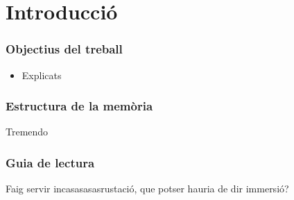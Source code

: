 \chapter{Introducci\'o}



\subsection*{Objectius del treball}

\begin{itemize}
    \item Explicats
\end{itemize}

\subsection*{Estructura de la mem\`oria}
Tremendo

\subsection*{Guia de lectura}
Faig servir incasasasasrustació, que potser hauria de dir immersió?

\newpage

\setcounter{page}{1}
